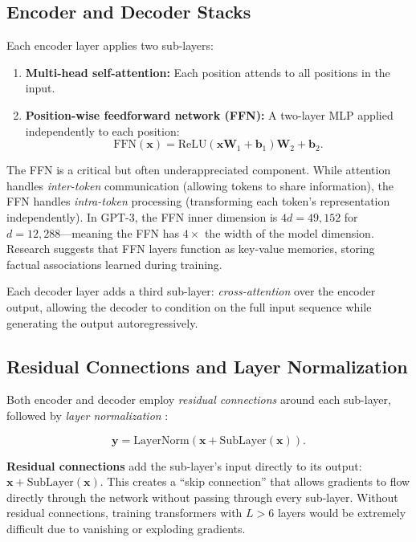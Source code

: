 \subsection{Encoder and Decoder Stacks}

Each encoder layer applies two sub-layers:
\begin{enumerate}[leftmargin=1.8em]
  \item \textbf{Multi-head self-attention:} Each position attends to all positions in the input.
  \item \textbf{Position-wise feedforward network (FFN):} A two-layer MLP applied independently to each position:
  \begin{equation}
    \text{FFN}(\mathbf{x}) = \text{ReLU}(\mathbf{x}\mathbf{W}_1 + \mathbf{b}_1)\mathbf{W}_2 + \mathbf{b}_2.
    \label{eq:ffn}
  \end{equation}
\end{enumerate}

The FFN is a critical but often underappreciated component. While attention handles \emph{inter-token} communication (allowing tokens to share information), the FFN handles \emph{intra-token} processing (transforming each token's representation independently). In GPT-3, the FFN inner dimension is $4d = 49{,}152$ for $d = 12{,}288$---meaning the FFN has $4 \times$ the width of the model dimension. Research suggests that FFN layers function as key-value memories, storing factual associations learned during training.

Each decoder layer adds a third sub-layer: \emph{cross-attention} over the encoder output, allowing the decoder to condition on the full input sequence while generating the output autoregressively.

\subsection{Residual Connections and Layer Normalization}

Both encoder and decoder employ \emph{residual connections} \citep{he2016} around each sub-layer, followed by \emph{layer normalization} \citep{ba2016}:

\begin{equation}
\mathbf{y} = \text{LayerNorm}(\mathbf{x} + \text{SubLayer}(\mathbf{x})).
\label{eq:residual-ln}
\end{equation}

\textbf{Residual connections} add the sub-layer's input directly to its output: $\mathbf{x} + \text{SubLayer}(\mathbf{x})$. This creates a ``skip connection'' that allows gradients to flow directly through the network without passing through every sub-layer. Without residual connections, training transformers with $L > 6$ layers would be extremely difficult due to vanishing or exploding gradients.

